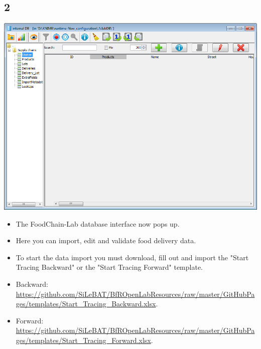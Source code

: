 \documentclass{beamer}
\begin{document}
\subsection{2}
\begin{frame}
	\begin{center}
  		\includegraphics[height=0.35\textheight]{2.png}
	\end{center}
	\begin{itemize}
		\item The FoodChain-Lab database interface now pops up.
		\item Here you can import, edit and validate food delivery data.
		\item To start the data import you must download, fill out and import the "Start Tracing Backward" or  the "Start Tracing Forward" template.
		\item Backward: \url{https://github.com/SiLeBAT/BfROpenLabResources/raw/master/GitHubPages/templates/Start_Tracing_Backward.xlsx}.
		\item Forward: \url{https://github.com/SiLeBAT/BfROpenLabResources/raw/master/GitHubPages/templates/Start_Tracing_Forward.xlsx}.
	\end{itemize}
\end{frame}
\end{document}
